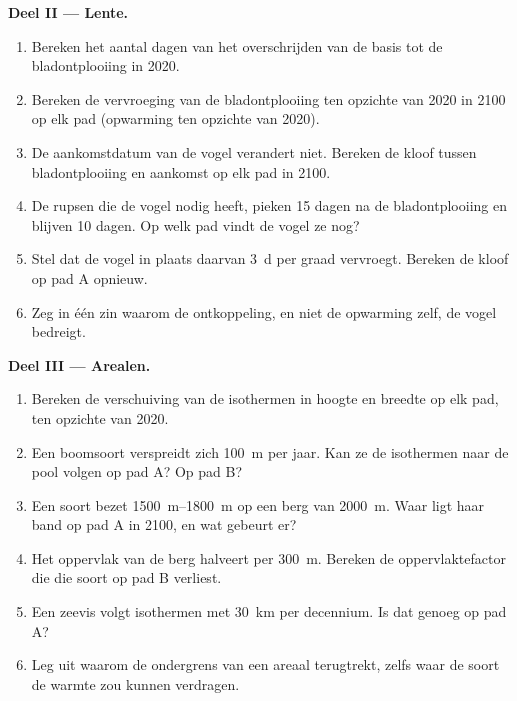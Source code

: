 \begin{problem}
\medskip
\noindent\textbf{Deel II --- Lente.}
\begin{enumerate}[resume]
  \item Bereken het aantal dagen van het overschrijden van de basis tot de
        bladontplooiing in 2020.
  \item Bereken de vervroeging van de bladontplooiing ten opzichte van 2020 in
        2100 op elk pad (opwarming ten opzichte van 2020).
  \item De aankomstdatum van de vogel verandert niet. Bereken de kloof
        tussen bladontplooiing en aankomst op elk pad in 2100.
  \item De rupsen die de vogel nodig heeft, pieken 15 dagen na de
        bladontplooiing en blijven 10 dagen. Op welk pad vindt de vogel ze
        nog?
  \item Stel dat de vogel in plaats daarvan \qty{3}{d} per graad vervroegt.
        Bereken de kloof op pad A opnieuw.
  \item Zeg in één zin waarom de ontkoppeling, en niet de opwarming
        zelf, de vogel bedreigt.
\end{enumerate}

\medskip
\noindent\textbf{Deel III --- Arealen.}
\begin{enumerate}[resume]
  \item Bereken de verschuiving van de isothermen in hoogte en breedte
        op elk pad, ten opzichte van 2020.
  \item Een boomsoort verspreidt zich \qty{100}{m} per jaar. Kan ze de
        isothermen naar de pool volgen op pad A? Op pad B?
  \item Een soort bezet \qtyrange{1500}{1800}{m} op een berg van
        \qty{2000}{m}. Waar ligt haar band op pad A in 2100, en wat gebeurt er?
  \item Het oppervlak van de berg halveert per \qty{300}{m}. Bereken de
        oppervlaktefactor die die soort op pad B verliest.
  \item Een zeevis volgt isothermen met \qty{30}{km} per decennium.
        Is dat genoeg op pad A?
  \item Leg uit waarom de ondergrens van een areaal terugtrekt, zelfs waar
        de soort de warmte zou kunnen verdragen.
\end{enumerate}


\end{problem}
